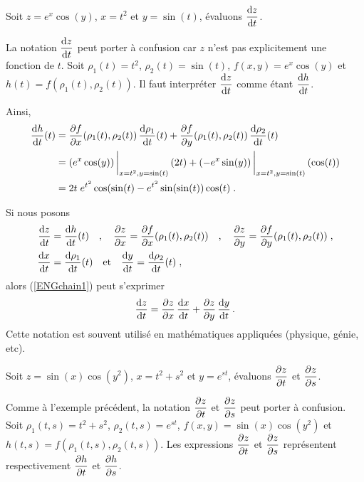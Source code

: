 {\begin{egg}
Soit $z=e^x\cos(y)$, $x=t^2$ et $y=\sin(t)$, évaluons
$\displaystyle \frac{\mathrm{d}z}{\mathrm{d}t}$.

La notation $\displaystyle \frac{\mathrm{d}z}{\mathrm{d}t}$ peut porter à confusion car
$z$ n'est pas explicitement une fonction de $t$.  Soit
$\rho_1(t) = t^2$, $\rho_2(t) = \sin(t)$, $f(x,y) = e^x\cos(y)$ et
$h(t) = f(\rho_1(t), \rho_2(t))$.   Il faut interpréter 
$\displaystyle \frac{\mathrm{d}z}{\mathrm{d}t}$ comme étant
$\displaystyle \frac{\mathrm{d}h}{\mathrm{d}t}$.

Ainsi,
\begin{align}
\frac{\mathrm{d}h}{\mathrm{d}t}(t) &= \frac{\partial f}{\partial x}(\rho_1(t),\rho_2(t))\,\frac{\mathrm{d}\rho_1}{\mathrm{d}t}(t) +
\frac{\partial f}{\partial y}(\rho_1(t),\rho_2(t)) \, \frac{\mathrm{d}\rho_2}{\mathrm{d}t}(t) \label{ENGchain1} \\
&=\left(e^x\cos(y)\right)\bigg|_{x=t^2,y=\sin(t)}
\left(2t\right) + \left(-e^x\sin(y)\right)\bigg|_{x=t^2,y=\sin(t)}
\left(\cos(t)\right) \nonumber \\
&=2t\; e^{t^2}\cos(\sin(t) -e^{t^2} \sin(\sin(t))\cos(t) \; . \nonumber
\end{align}

Si nous posons
\begin{align*}
\frac{\mathrm{d}z}{\mathrm{d}t} &= \frac{\mathrm{d}h}{\mathrm{d}t}(t) \quad, \quad
\frac{\partial z}{\partial x} = \frac{\partial f}{\partial x}(\rho_1(t),\rho_2(t))\quad, \quad
\frac{\partial z}{\partial y} = \frac{\partial f}{\partial y}(\rho_1(t),\rho_2(t))\;,\\
\frac{\mathrm{d}x}{\mathrm{d}t} &= \frac{\mathrm{d}\rho_1}{\mathrm{d}t}(t)\quad
\text{et} \quad \frac{\mathrm{d}y}{\mathrm{d}t} = \frac{\mathrm{d}\rho_2}{\mathrm{d}t}(t) \; ,
\end{align*}
alors (\ref{ENGchain1}) peut s'exprimer
\[
\frac{\mathrm{d}z}{\mathrm{d}t} = \frac{\partial z}{\partial x}\,\frac{\mathrm{d}x}{\mathrm{d}t} + \frac{\partial z}{\partial y} \,
\frac{\mathrm{d}y}{\mathrm{d}t} \, .
\]
Cette notation est souvent utilisé en mathématiques appliquées
(physique, génie, etc).
\end{egg}

\begin{egg}
Soit $z=\sin(x)\cos(y^2)$, $x=t^2 + s^2$ et $y=e^{st}$, évaluons
$\displaystyle \frac{\partial z}{\partial t}$ et $\displaystyle \frac{\partial z}{\partial s}$.

Comme à l'exemple précédent, la notation
$\displaystyle \frac{\partial z}{\partial t}$ et $\displaystyle \frac{\partial z}{\partial s}$
peut porter à confusion.  Soit $\rho_1(t,s) = t^2+s^2$,
$\rho_2(t,s) = e^{st}$, $f(x,y) = \sin(x)\cos(y^2)$
et $h(t,s) = f(\rho_1(t,s), \rho_2(t,s))$.  Les expressions
$\displaystyle \frac{\partial z}{\partial t}$ et $\displaystyle \frac{\partial z}{\partial s}$ 
représentent respectivement
$\displaystyle \frac{\partial h}{\partial t}$ et $\displaystyle \frac{\partial h}{\partial s}$.


\end{egg}}
